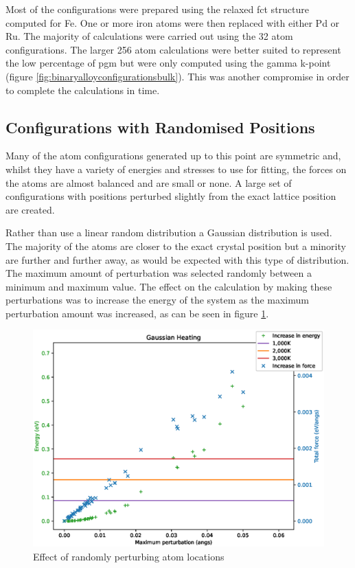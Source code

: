 Most of the configurations were prepared using the relaxed \acrshort{fct} structure computed for Fe.  One or more iron atoms were then replaced with either Pd or Ru.  The majority of calculations were carried out using the 32 atom configurations.  The larger 256 atom calculations were better suited to represent the low percentage of \acrshort{pgm} but were only computed using the gamma k-point (figure \ref{fig:binaryalloyconfigurationsbulk}).  This was another compromise in order to complete the calculations in time.



\subsection{Configurations with Randomised Positions}

Many of the atom configurations generated up to this point are symmetric and, whilst they have a variety of energies and stresses to use for fitting, the forces on the atoms are almost balanced and are small or none.  A large set of configurations with positions perturbed slightly from the exact lattice position are created.

Rather than use a linear random distribution a Gaussian distribution is used.  The majority of the atoms are closer to the exact crystal position but a minority are further and further away, as would be expected with this type of distribution.  The maximum amount of perturbation was selected randomly between a minimum and maximum value.  The effect on the calculation by making these perturbations was to increase the energy of the system as the maximum perturbation amount was increased, as can be seen in figure \ref{fig:pwheatal}.

\begin{figure}[h]
\begin{center}
\includegraphics[scale=0.60]{chapters/potentials_fe_pd_ru/pwheat/al/alheat.eps}
\caption{Effect of randomly perturbing atom locations}
\label{fig:pwheatal}
\end{center}
\end{figure}

